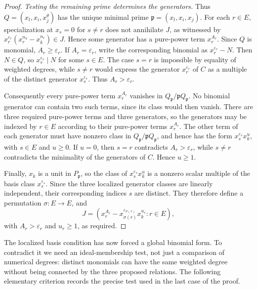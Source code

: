 \documentclass[10pt]{amsart}
\theoremstyle{plain}
\begin{document}
\begin{proof}
\emph{Testing the remaining prime determines the generators.}
Thus
\(Q=(x_l,x_i,x_j^\theta)\) has the unique minimal prime
\(\mathfrak p=(x_l,x_i,x_j)\).  For each \(r\in E\), specialization
at \(x_s=0\) for \(s\ne r\) does not annihilate \(J\), as witnessed by
\(x_r^{\varepsilon_r}(x_r^{n_k}-x_k^{n_r})\in J\).
Hence some generator has a pure-power term \(x_r^{A_r}\).
Since \(Q\) is monomial, \(A_r\ge\varepsilon_r\).  If
\(A_r=\varepsilon_r\), write the corresponding binomial as
\(x_r^{\varepsilon_r}-N\).  Then \(N\in Q\), so
\(x_s^{\varepsilon_s}\mid N\) for some \(s\in E\).  The case \(s=r\)
is impossible by equality of weighted degrees, while \(s\ne r\)
would express the generator \(x_r^{\varepsilon_r}\) of \(C\) as a
multiple of the distinct generator \(x_s^{\varepsilon_s}\).
Thus \(A_r>\varepsilon_r\).

Consequently every pure-power term \(x_r^{A_r}\) vanishes in
\(Q_{\mathfrak p}/\mathfrak pQ_{\mathfrak p}\).  No binomial generator
can contain two such terms, since its class would then vanish.  There
are three required pure-power terms and three generators, so the
generators may be indexed by \(r\in E\) according to their pure-power
terms \(x_r^{A_r}\).  The other term of each generator must have
nonzero class in \(Q_{\mathfrak p}/\mathfrak pQ_{\mathfrak p}\), and
hence has the form
\(x_s^{\varepsilon_s}x_k^u\), with \(s\in E\) and \(u\ge0\).
If \(u=0\), then \(s=r\) contradicts
\(A_r>\varepsilon_r\), while \(s\ne r\) contradicts the minimality of
the generators of \(C\).  Hence \(u\ge1\).

Finally, \(x_k\) is a unit in \(P_{\mathfrak p}\), so the class of
\(x_s^{\varepsilon_s}x_k^u\) is a nonzero scalar multiple of the basis
class \(x_s^{\varepsilon_s}\).  Since the three localized generator
classes are linearly independent, their corresponding indices \(s\)
are distinct.  They therefore define a permutation
\(\sigma:E\to E\), and
\[
J=\left(
x_r^{A_r}
-x_{\sigma(r)}^{\varepsilon_{\sigma(r)}}x_k^{u_r}
:r\in E
\right),
\]
with \(A_r>\varepsilon_r\) and \(u_r\ge1\), as required.
\end{proof}

The localized basis condition has now forced a global binomial form.
To contradict it we need an ideal-membership test, not just a comparison
of numerical degrees: distinct monomials can have the same weighted
degree without being connected by the three proposed relations.  The
following elementary criterion records the precise test used in the
last case of the proof.
\end{document}
